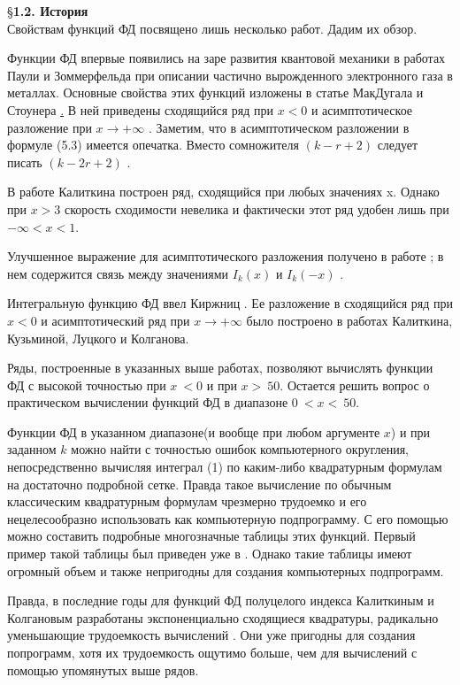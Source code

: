 \S \textbf{1.2. История}
\\

Свойствам функций ФД посвящено лишь несколько работ. Дадим их обзор.

Функции ФД впервые появились на заре развития квантовой механики в работах Паули \cite{Pauli} и Зоммерфельда \cite{Sommerfeld} при описании частично вырожденного электронного газа в металлах. Основные свойства этих функций изложены в статье МакДугала и Стоунера \href{Stoner}. В ней приведены сходящийся ряд при $x < 0$ и асимптотическое разложение при $x \to +\infty$ . Заметим, что в асимптотическом разложении в формуле (5.3) имеется опечатка. Вместо сомножителя $(k - r + 2)$ следует писать $(k - 2r + 2)$ .

В работе Калиткина \cite{Kalitkin1968} построен ряд, сходящийся при любых значениях x. Однако при $x > 3$ скорость сходимости невелика и фактически этот ряд удобен лишь при $-\infty < x < 1$.

Улучшенное выражение для асимптотического разложения получено в работе \cite{Glasser}; в нем содержится связь между значениями  $I_k(x)$ и $I_k(-x)$ .

Интегральную функцию ФД ввел Киржниц \cite{Kirzhniz}. Ее разложение в сходящийся ряд при $x < 0$  и асимптотический ряд при $x \to +\infty$ было построено в работах Калиткина, Кузьминой, Луцкого и Колганова.

Ряды, построенные в указанных выше работах, позволяют вычислять функции ФД с высокой точностью при $x ~< 0$ и при $x >~ 50$. Остается решить вопрос о практическом вычислении функций ФД в диапазоне $0 ~<x <~ 50$.

Функции ФД в указанном диапазоне(и вообще при любом аргументе $x$) и при заданном $k$ можно найти с
точностью ошибок компьютерного округления, непосредственно вычисляя
интеграл (1) по каким-либо квадратурным формулам на достаточно
подробной сетке. Правда такое вычисление по обычным классическим квадратурным формулам чрезмерно трудоемко и его нецелесообразно использовать как компьютерную подпрограмму. С его помощью можно составить подробные многозначные таблицы этих функций. Первый пример такой таблицы был приведен уже в \cite{Stoner}. Однако такие таблицы имеют огромный объем и также непригодны для создания компьютерных подпрограмм.

Правда, в последние годы для функций ФД полуцелого индекса Калиткиным и Колгановым разработаны экспоненциально сходящиеся квадратуры, радикально уменьшающие трудоемкость вычислений \cite{Kalitkin_Kolganov_ExpConvDan,Kalitkin_Kolganov_ExpConvMatMod,Kalitkin_Kolganov_Preprint1}. Они уже пригодны для создания попрограмм, хотя их трудоемкость ощутимо больше, чем для вычислений с помощью упомянутых выше рядов.

